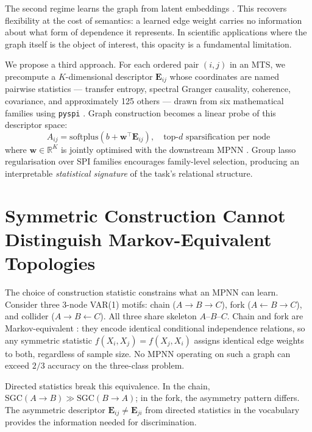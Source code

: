 \documentclass{article}
\theoremstyle{plain}
\begin{document}
The second regime learns the graph from latent embeddings \citep{kipf2018,wu2019,wu2020}. This recovers flexibility at the cost of semantics: a learned edge weight carries no information about what form of dependence it represents. In scientific applications where the graph itself is the object of interest, this opacity is a fundamental limitation.

We propose a third approach. For each ordered pair $(i, j)$ in an MTS, we precompute a $K$-dimensional descriptor $\mathbf{E}_{ij}$ whose coordinates are named pairwise statistics --- transfer entropy, spectral Granger causality, coherence, covariance, and approximately 125 others --- drawn from six mathematical families using \texttt{pyspi} \citep{cliff2023}. Graph construction becomes a linear probe of this descriptor space:
%
\begin{equation}
\label{eq:adj}
A_{ij} = \mathrm{softplus}\!\left(b + \mathbf{w}^\top \mathbf{E}_{ij}\right), \quad \text{top-}d \text{ sparsification per node}
\end{equation}
%
where $\mathbf{w} \in \mathbb{R}^K$ is jointly optimised with the downstream MPNN \citep[cf.][]{alain2017}. Group lasso regularisation \citep{yuan2006} over SPI families encourages family-level selection, producing an interpretable \emph{statistical signature} of the task's relational structure.

\section{Symmetric Construction Cannot Distinguish Markov-Equivalent Topologies}
\label{sec:theory}

The choice of construction statistic constrains what an MPNN can learn. Consider three 3-node VAR(1) motifs: chain ($A \to B \to C$), fork ($A \leftarrow B \to C$), and collider ($A \to B \leftarrow C$). All three share skeleton $A$--$B$--$C$. Chain and fork are Markov-equivalent \citep{verma1990}: they encode identical conditional independence relations, so any symmetric statistic $f(X_i, X_j) = f(X_j, X_i)$ assigns identical edge weights to both, regardless of sample size. No MPNN operating on such a graph can exceed $2/3$ accuracy on the three-class problem.

Directed statistics break this equivalence. In the chain, $\mathrm{SGC}(A \to B) \gg \mathrm{SGC}(B \to A)$; in the fork, the asymmetry pattern differs. The asymmetric descriptor $\mathbf{E}_{ij} \neq \mathbf{E}_{ji}$ from directed statistics in the vocabulary provides the information needed for discrimination.
\end{document}
